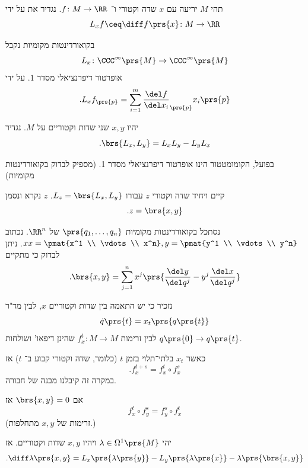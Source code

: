 \documentclass[a4paper,10pt,twoside,openany]{book}
\begin{document}
\begin{definition}
תהי
$M$
יריעה עם
$x$
שדה וקטורי ו־%
$f \colon M \to \RR$.
נגדיר את
על ידי
\[L_x f \ceq \diff f\prs{x} \colon M \to \RR\]
\end{definition}
\begin{remark}
בקואורדינטות מקומיות נקבל
\[L_x \colon \CCC^{\infty}\prs{M} \to \CCC^{\infty}\prs{M}\]
אופרטור דיפרנציאלי מסדר
$1$.
על ידי
\[\text{.} L_x f_{\prs{p}} = \sum_{i=1}^m \frac{\del f}{\del x_i}_{\prs{p}} x_i \prs{p}\]
\end{remark}

\begin{definition}
יהיו
$x,y$
שני שדות וקטוריים על
$M$.
נגדיר
\[\text{.} \brs{L_x, L_y} = L_x L_y - L_y L_x\]
\end{definition}
\begin{exercise}
בפועל, הקומומטטור הינו אופרטור דיפרנציאלי מסדר 1. (מספיק לבדוק בקואורדינטות מקומיות)
\end{exercise}
\begin{exercise}
קיים ויחיד שדה וקטורי
$z$
עבורו
$L_z = \brs{L_x, L_y}$.
$z$
נקרא
ונסמן
\[\text{.} z = \brs{x,y}\]
\end{exercise}
\begin{remark}
נסתכל בקואורדינטות מקומיות
$\prs{q_1, \ldots, q_n}$
של
$\RR^n$.
נכתוב
$xx = \pmat{x^1 \\ \vdots \\ x^n}, y = \pmat{y^1 \\ \vdots \\ y^n}$.
ניתן לבדוק כי מתקיים
\[\text{.} \brs{x,y} = \sum_{j=1}^n x^j \prs{\frac{\del y}{\del q^j} - y^j \frac{\del x}{\del q^j}}\]
\end{remark}

נזכיר כי יש התאמה בין שדות וקטוריים
$x$,
לבין מד"ר
\[\dot{q}\prs{t} = x_t\prs{q\prs{t}}\]
לבין זרימות
$f^t_x \colon M \to M$
שהינן דיפאו' ושולחות
$q\prs{0} \to q\prs{t}$.

כאשר
$x_t$
בלתי־תלוי בזמן
$t$ (כלומר, שדה וקטורי קבוע ב־%
$t$)
אז
\[\text{.} f_x^{t+s} = f_x^t \circ f_x^s\]
במקרה זה קיבלנו מבנה של חבורה.

\begin{exercise}
אם
$\brs{x,y} = 0$
אז
\[f_x^t \circ f_y^s = f_y^s \circ f_x^t\]
(זרימות של
$x,y$ מתחלפות.)
\end{exercise}

\begin{proposition}
יהי
$\lambda \in \Omega^1 \prs{M}$
ויהיו
$x,y$
שדות וקטוריים. אז
\[\text{.} \diff \lambda \prs{x,y} = L_x\prs{\lambda\prs{y}} - L_y\prs{\lambda\prs{x}} - \lambda\prs{\brs{x,y}}\]
\end{proposition}
\end{document}
